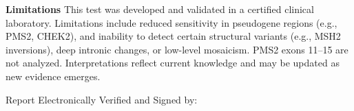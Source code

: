 \documentclass[11pt]{extarticle}
\begin{document}
{\Large \bf Limitations \newline}
This test was developed and validated in a certified clinical laboratory. Limitations include reduced sensitivity in pseudogene regions (e.g., PMS2, CHEK2), and inability to detect certain structural variants (e.g., MSH2 inversions), deep intronic changes, or low-level mosaicism. PMS2 exons 11–15 are not analyzed. Interpretations reflect current knowledge and may be updated as new evidence emerges.

\newpage
{\huge Report Electronically Verified and Signed by: }
\end{document}
